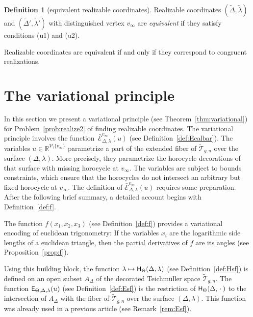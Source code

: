 \documentclass[a4paper, 11pt]{article}
\newcommand{\R}{\mathbb{R}}
\newcommand{\Teich}{\mathcal{T}}
\newcommand{\decTeich}{\widetilde{\Teich}}
\newcommand{\Tm}{Teich\-m{\"u}l\-ler}
\newcommand{\Deltil}{\widetilde{\Delta}}
\newcommand{\lamtil}{\tilde{\lambda}}
\newcommand{\Ecal}{\mathcal{E}}
\newcommand{\Ecalbar}{\bar{\Ecal}}
\newcommand{\Hsf}{\scalebox{0.94}{$\mathsf{H}$}}
\newcommand{\Esf}{\scalebox{0.94}{$\mathsf{E}$}}
\theoremstyle{plain}
\theoremstyle{definition}
\newtheorem{definition}[theorem]{Definition}
\begin{document}
\begin{definition}[equivalent realizable coordinates]
  \label{def:realizequiv}
  Realizable coordinates $(\Deltil,\lamtil)$ and $(\Deltil',\lamtil')$
  with distinguished vertex $v_{\infty}$ are \emph{equivalent} if they
  satisfy conditions (u1) and (u2).
\end{definition}

Realizable coordinates are equivalent if and only if they
correspond to congruent realizations.

\section{The variational principle}
\label{sec:variational}

In this section we present a variational principle
(see Theorem~\ref{thm:variational}) for Problem~\ref{prob:realize2} of
finding realizable coordinates. The variational principle involves the
function~$\Ecalbar^{v_{\infty}}_{\Delta,\lambda}(u)$
(see Definition~\ref{def:Ecalbar}). The variables
$u\in\R^{V\setminus\{v_{\infty}\}}$ parametrize a part of the extended
fiber of $\widetilde{\Teich}_{g,n}$ over the surface
$(\Delta,\lambda)$. More precisely, they parametrize the horocycle
decorations of that surface with missing horocycle at
$v_{\infty}$. The variables are subject to bounds constraints, which
ensure that the horocycles do not intersect an arbitrary but fixed
horocycle at $v_{\infty}$. The definition of
$\Ecalbar^{v_{\infty}}_{\Delta,\lambda}(u)$ requires some
preparation. After the following brief summary, a detailed account
begins with Definition~\ref{def:f}.

The function $f(x_{1},x_{2},x_{3})$ (see Definition~\ref{def:f}) provides
a variational encoding of euclidean trigonometry: If the variables
$x_{i}$ are the logarithmic side lengths of a euclidean triangle, then
the partial derivatives of $f$ are its angles
(see Proposition~\ref{prop:f}). 

Using this building block, the function
$\lambda\mapsto\Hsf_{\Theta}(\Delta,\lambda)$
(see Definition~\ref{def:Hsf}) is defined on an open subset $A_{\Delta}$
of the decorated {\Tm} space $\decTeich_{g,n}$. The function
$\Esf_{\Theta,\Delta,\lambda}(u)$ (see Definition~\ref{def:Esf}) is the
restriction of $\Hsf_{\Theta}(\Delta,\,\cdot\,)$ to the intersection
of $A_{\Delta}$ with the fiber of $\decTeich_{g,n}$ over the surface
$(\Delta,\lambda)$. This function was already used in a previous
article (see Remark~\ref{rem:Esf}).
\end{document}
